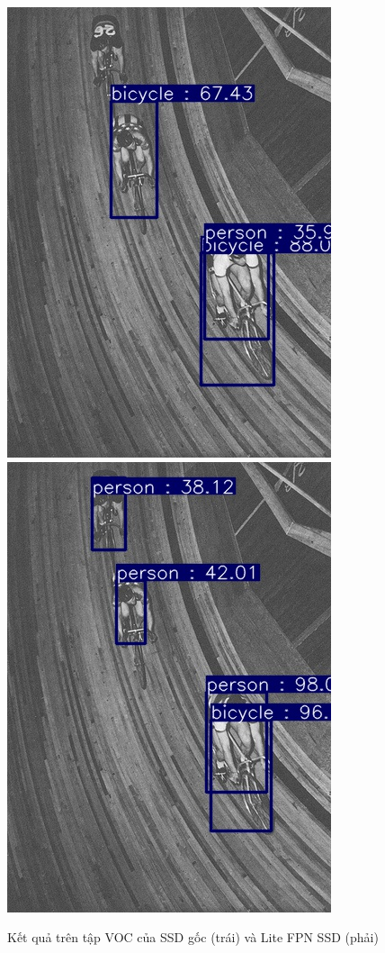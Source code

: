 \documentclass[a4paper]{article}
\begin{document}
\begin{figure}[h]
\begin{multicols}{2}
		\includegraphics[width=0.7\linewidth]{fig/VOC_78}
		\includegraphics[width=0.7\linewidth]{fig/VOC_FPN_78}
	\end{multicols}
	\captionsetup{justification=centering}
	\caption{Kết quả trên tập VOC của SSD gốc (trái) và Lite FPN SSD (phải)}
	\label{onVOC}
\end{figure} 
\end{document}
